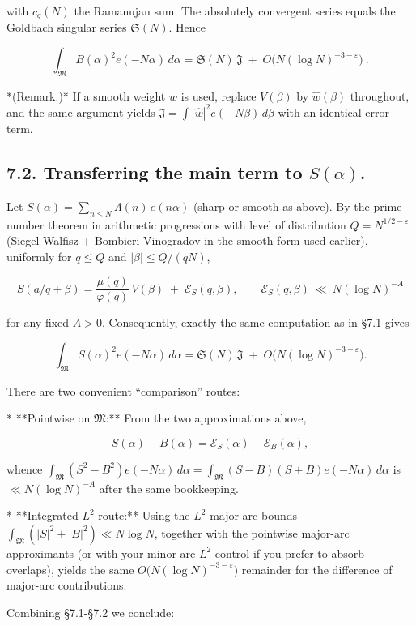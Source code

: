 \documentclass[11pt]{article}
\theoremstyle{definition}
\theoremstyle{remark}
\begin{document}
with $c_q(N)$ the Ramanujan sum. The absolutely convergent series equals the Goldbach singular series $\mathfrak S(N)$. Hence

$$
\boxed{\,\int_{\mathfrak M} B(\alpha)^2 e(-N\alpha)\,d\alpha
=\mathfrak S(N)\,\mathfrak J\;+\;O\!\big(N(\log N)^{-3-\varepsilon}\big)\ .\ }
$$

*(Remark.)* If a smooth weight $w$ is used, replace $V(\beta)$ by $\widehat w(\beta)$ throughout, and the same argument yields $\mathfrak J=\int|\widehat w|^2 e(-N\beta)\,d\beta$ with an identical error term.

\subsection*{7.2. Transferring the main term to $S(\alpha)$.}

Let $S(\alpha)=\sum_{n\le N}\Lambda(n)\,e(n\alpha)$ (sharp or smooth as above). By the prime number theorem in arithmetic progressions with level of distribution $Q=N^{1/2-\varepsilon}$ (Siegel-Walfisz + Bombieri-Vinogradov in the smooth form used earlier), uniformly for $q\le Q$ and $|\beta|\le Q/(qN)$,

$$
S(a/q+\beta)=\frac{\mu(q)}{\varphi(q)}\,V(\beta) \;+\; \mathcal E_S(q,\beta),
\qquad \mathcal E_S(q,\beta)\ \ll\ N(\log N)^{-A}
$$

for any fixed $A>0$. Consequently, exactly the same computation as in §7.1 gives

$$
\int_{\mathfrak M} S(\alpha)^2 e(-N\alpha)\,d\alpha
=\mathfrak S(N)\,\mathfrak J\;+\;O\!\big(N(\log N)^{-3-\varepsilon}\big).
$$

There are two convenient “comparison” routes:

* **Pointwise on $\mathfrak M$:** From the two approximations above,

  $$
  S(\alpha)-B(\alpha)=\mathcal E_S(\alpha)-\mathcal E_B(\alpha),
  $$

  whence $\int_{\mathfrak M}(S^2-B^2)e(-N\alpha)\,d\alpha =\int_{\mathfrak M}(S-B)(S+B)e(-N\alpha)\,d\alpha$
  is $\ll N(\log N)^{-A}$ after the same bookkeeping.

* **Integrated $L^2$ route:** Using the $L^2$ major-arc bounds $\int_{\mathfrak M}(|S|^2+|B|^2)\ll N\log N$, together with the pointwise major-arc approximants (or with your minor-arc $L^2$ control if you prefer to absorb overlaps), yields the same $O\big(N(\log N)^{-3-\varepsilon}\big)$ remainder for the difference of major-arc contributions.

Combining §7.1-§7.2 we conclude:
\end{document}
